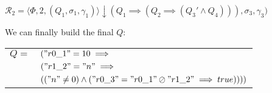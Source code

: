 $\mathcal{R}_2 = \langle \Phi, 2, (Q_1, \sigma_1, \gamma_1) \rangle \downarrow (Q_1 \implies (Q_2 \implies (Q_3' \land Q_4))), \sigma_3, \gamma_3)$ 

  We can finally build the final $Q$: \\
\begin{tabular}{ll}
  $Q =$ & $("r0\_1" = 10 \implies $ \\
        & $("r1\_2" = "n" \implies $ \\
        & $(("n" \neq 0) \land ("r0\_3" = "r0\_1" \oslash "r1\_2" \implies true))))$
\end{tabular}
  
  
  \begin{prooftree}
\end{prooftree}


